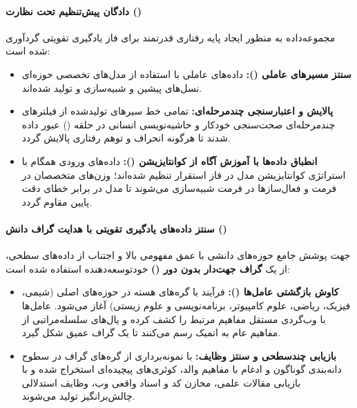 \paragraph*{دادگان پیش‌تنظیم تحت نظارت ()}
مجموعه‌داده  به منظور ایجاد پایه رفتاری قدرتمند برای فاز یادگیری تقویتی گردآوری شده است:
\begin{itemize}
    \item \textbf{سنتز مسیرهای عاملی ():} داده‌های عاملی با استفاده از مدل‌های تخصصی حوزه‌ای نسل‌های پیشین  \cite{kimi2025k2} و  \cite{kimi2026k25} شبیه‌سازی و تولید شده‌اند.
    \item \textbf{پالایش و اعتبارسنجی چندمرحله‌ای:} تمامی خط سیرهای تولیدشده از فیلترهای چندمرحله‌ای صحت‌سنجی خودکار و حاشیه‌نویسی انسانی در حلقه () عبور داده شدند تا هرگونه انحراف و توهم رفتاری پالایش گردد.
    \item \textbf{انطباق داده‌ها با آموزش آگاه از کوانتایزیشن ():} داده‌های ورودی همگام با استراتژی کوانتایزیشن مدل در فاز استقرار تنظیم شده‌اند؛ وزن‌های متخصصان  در فرمت  و فعال‌سازها در فرمت  \cite{rouhani2023mxfp} شبیه‌سازی می‌شوند تا مدل در برابر خطای دقت پایین مقاوم گردد.
\end{itemize}

\paragraph*{سنتز داده‌های یادگیری تقویتی با هدایت گراف دانش ()}
جهت پوشش جامع حوزه‌های دانشی با عمق مفهومی بالا و اجتناب از داده‌های سطحی، از یک \textbf{گراف جهت‌دار بدون دور ()} خودتوسعه‌دهنده استفاده شده است:
\begin{itemize}
    \item \textbf{کاوش بازگشتی عامل‌ها ():} فرآیند با گره‌های هسته در حوزه‌های اصلی (شیمی، فیزیک، ریاضی، علوم کامپیوتر، برنامه‌نویسی و علوم زیستی) آغاز می‌شود. عامل‌ها با وب‌گردی مستقل مفاهیم مرتبط را کشف کرده و یال‌های سلسله‌مراتبی از مفاهیم عام به اتمیک رسم می‌کنند تا یک گراف عمیق شکل گیرد.
    \item \textbf{بازیابی چندسطحی و سنتز وظایف:} با نمونه‌برداری از گره‌های گراف در سطوح دانه‌بندی گوناگون و ادغام با مفاهیم والد، کوئری‌های پیچیده‌ای استخراج شده و با بازیابی مقالات علمی، مخازن کد و اسناد واقعی وب، وظایف استدلالی چالش‌برانگیز تولید می‌شوند.
\end{itemize}

